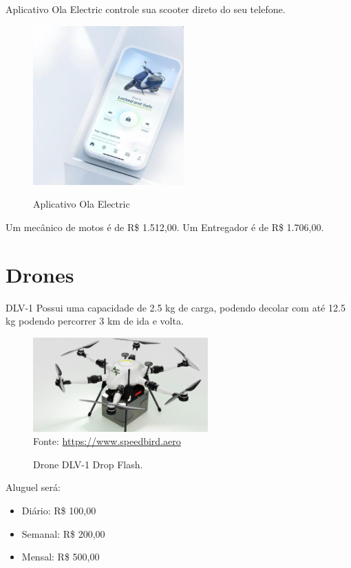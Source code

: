 Aplicativo Ola Electric controle sua scooter direto do seu telefone.

\begin{figure} [!ht]
    {\centering
    \caption{Aplicativo Ola Electric}
    \includegraphics[height=0.4\linewidth]{figuras/app ola.png}
    \label{fig:enter-label}
    }
\end{figure}

Um mecânico de motos é de R\$ 1.512,00.
Um Entregador é de R\$ 1.706,00.

\section{Drones}

DLV-1 Possui uma capacidade de 2.5 kg de carga, podendo decolar com até 12.5 kg podendo percorrer 3 km de ida e volta.

\begin{figure}[!ht]
    \centering
    \caption{Drone DLV-1 Drop Flash.}
    \includegraphics[width=0.6\textwidth]{figuras/DLV1.png}
    \label{fig:DLV1}\\
    \small Fonte: \url{https://www.speedbird.aero}
\end{figure}

Aluguel será: 
\begin{itemize}
    \item Diário: R\$ 100,00
    \item Semanal: R\$ 200,00
    \item Mensal: R\$ 500,00
\end{itemize}

